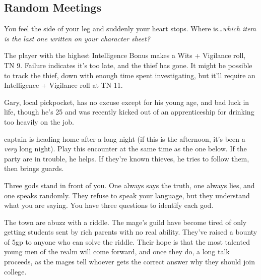 \begin{multicols}{2}

\subsection{Random Meetings}\label{randommeetings}


\begin{boxtext}

	You feel the side of your leg and suddenly your heart stops.  Where is\ldots \textit{which item is the last one written on your character sheet?}

\end{boxtext}

The player with the highest Intelligence Bonus makes a Wits + Vigilance roll, TN 9.  Failure indicates it's too late, and the thief has gone.  It might be possible to track the thief, down with enough time spent investigating, but it'll require an Intelligence + Vigilance roll at TN 11.

Gary, local pickpocket, has no excuse except for his young age, and bad luck in life, though he's 25 and was recently kicked out of an apprenticeship for drinking too heavily on the job.

\humanthief



\Gls{captain} is heading home after a long night (if this is the afternoon, it's been a \emph{very} long night).  Play this encounter at the same time as the one below.  If the party are in trouble, he helps.  If they're known thieves, he tries to follow them, then brings guards.




\begin{boxtext}
Three gods stand in front of you.  One always says the truth, one always lies, and one speaks randomly.  They refuse to speak your language, but they understand what you are saying.  You have three questions to identify each god.
\end{boxtext}

The town are abuzz with a riddle.  The mage's guild have become tired of only getting students sent by rich parents with no real ability.  They've raised a bounty of 5gp to anyone who can solve the riddle.  Their hope is that the most talented young men of the realm will come forward, and once they do, a long talk proceeds, as the mages tell whoever gets the correct answer why they should join \gls{college}.


\end{multicols}
